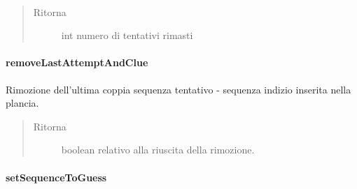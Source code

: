 \documentclass[letterpaper,10pt,italian,openany,oneside]{sphinxmanual}
\begin{document}
\begin{fulllineitems}
\label{\detokenize{source/it/unicam/cs/pa/mastermind/gamecore/BoardModel:it.unicam.cs.pa.mastermind.gamecore.BoardModel.leftAttempts()}}~\begin{quote}\begin{description}
\item[{Ritorna}] \leavevmode
int numero di tentativi rimasti

\end{description}\end{quote}

\end{fulllineitems}



\paragraph{removeLastAttemptAndClue}
\label{\detokenize{source/it/unicam/cs/pa/mastermind/gamecore/BoardModel:removelastattemptandclue}}

\begin{fulllineitems}
\label{\detokenize{source/it/unicam/cs/pa/mastermind/gamecore/BoardModel:it.unicam.cs.pa.mastermind.gamecore.BoardModel.removeLastAttemptAndClue()}}
Rimozione dell’ultima coppia sequenza tentativo - sequenza indizio inserita nella plancia.
\begin{quote}\begin{description}
\item[{Ritorna}] \leavevmode
boolean relativo alla riuscita della rimozione.

\end{description}\end{quote}

\end{fulllineitems}



\paragraph{setSequenceToGuess}
\label{\detokenize{source/it/unicam/cs/pa/mastermind/gamecore/BoardModel:setsequencetoguess}}
\end{document}
